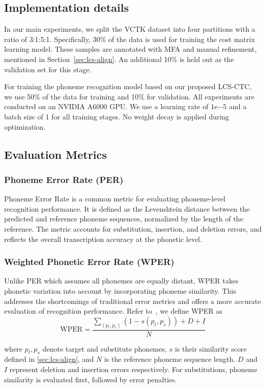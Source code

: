\subsection{Implementation details}
In our main experiments, we split the VCTK dataset into four partitions with a ratio of 3:1:5:1. Specifically, 30\% of the data is used for training the cost matrix learning model. These samples are annotated with MFA and manual refinement, mentioned in Section~\ref{sec:lcs-align}. An additional 10\% is held out as the validation set for this stage.

For training the phoneme recognition model based on our proposed LCS-CTC, we use 50\% of the data for training and 10\% for validation. All experiments are conducted on an NVIDIA A6000 GPU. We use a learning rate of $1\text{e}{-5}$ and a batch size of 1 for all training stages. No weight decay is applied during optimization.

\subsection{Evaluation Metrics}
\subsubsection{Phoneme Error Rate (PER)}
Phoneme Error Rate is a common metric for evaluating phoneme-level recognition performance. It is defined as the Levenshtein distance between the predicted and reference phoneme sequences, normalized by the length of the reference. The metric accounts for substitution, insertion, and deletion errors, and reflects the overall transcription accuracy at the phonetic level.
\subsubsection{Weighted Phonetic Error Rate (WPER)}Unlike PER which assumes all phonemes are equally distant, WPER takes phonetic variation into account by incorporating phoneme similarity. This addresses the shortcomings of traditional error metrics and offers a more accurate evaluation of recognition performance. Refer to~\cite{guo2025dysfluentwfstframeworkzeroshot}, we define WPER as
\[
\text{WPER} = \frac{\sum_{(p_t,p_s)} (1 - s(p_t,p_s)) + D + I}{N}
\]

where \( p_t, p_s \) denote target and substitute phonemes, \( s \) is their similarity score defined in \ref{sec:lcs-align}, 
and \( N \) is the reference phoneme sequence length. \( D \) and \( I \) represent deletion 
and insertion errors respectively. For substitutions, phoneme similarity is evaluated first,
followed by error penalties.
